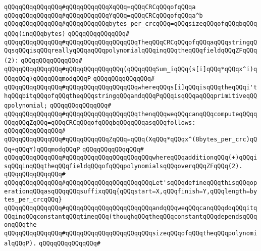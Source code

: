 \verb|qQQqqQQqqQQqqQQq#qQQqqQQqqQQqXqQQq=qQQqCRCqQQqofqQQqa|\newline
\verb|qQQqqQQqqQQqqQQq#qQQqqQQqqQQqYqQQq=qQQqCRCqQQqofqQQqa^b|\newline
\verb|qQQqqQQqqQQqqQQq#qQQqqQQqqQQqbytes_per_crcqQQq=qQQqsizeqQQqofqQQqbqQQqqQQq(inqQQqbytes)|\newline
\verb|qQQqqQQqqQQqqQQq#|\newline
\verb|qQQqqQQqqQQqqQQq#qQQqqQQqqQQqqQQqqQQqTheqQQqCRCqQQqofqQQqaqQQqstringqQQqsqQQqisqQQqreallyqQQqaqQQqpolynomialqQQqinqQQqtheqQQqfieldqQQqZFqQQq(2):|\newline
\verb|qQQqqQQqqQQqqQQq#|\newline
\verb|qQQqqQQqqQQqqQQq#qQQqqQQqqQQqqQQq(qQQqqQQqSum_iqQQq(s[i]qQQq*qQQqx^i)qQQqqQQq)qQQqqQQqmodqQQqP|\newline
\verb|qQQqqQQqqQQqqQQq#|\newline
\verb|qQQqqQQqqQQqqQQq#qQQqqQQqqQQqqQQqqQQqwhereqQQqs[i]qQQqisqQQqtheqQQqi'thqQQqbitqQQqofqQQqtheqQQqstringqQQqandqQQqPqQQqisqQQqaqQQqprimitiveqQQqpolynomial;|\newline
\verb|qQQqqQQqqQQqqQQq#|\newline
\verb|qQQqqQQqqQQqqQQq#qQQqqQQqqQQqqQQqqQQqthenqQQqweqQQqcanqQQqcomputeqQQqqQQqqQQqZqQQq=qQQqCRCqQQqofqQQqbqQQqqQQqasqQQqfollows:|\newline
\verb|qQQqqQQqqQQqqQQq#|\newline
\verb|qQQqqQQqqQQqqQQq#qQQqqQQqqQQqZqQQq=qQQq(XqQQq*qQQqx^(8bytes_per_crc)qQQq+qQQqY)qQQqmodqQQqP|\newline
\verb|qQQqqQQqqQQqqQQq#|\newline
\verb|qQQqqQQqqQQqqQQq#qQQqqQQqqQQqqQQqqQQqqQQqwhereqQQqadditionqQQq(+)qQQqisqQQqinqQQqtheqQQqfieldqQQqofqQQqpolynomialsqQQqoverqQQqZFqQQq(2).|\newline
\verb|qQQqqQQqqQQqqQQq#|\newline
\verb|qQQqqQQqqQQqqQQq#qQQqqQQqqQQqqQQqqQQqqQQqLet'sqQQqdefineqQQqthisqQQqoperationqQQqasqQQqqQQqsuffixqQQq{qQQqstart=X,qQQqfinish=Y,qQQqlength=bytes_per_crcqQQq}|\newline
\verb|qQQqqQQqqQQqqQQq#qQQqqQQqqQQqqQQqqQQqqQQqandqQQqweqQQqcanqQQqdoqQQqitqQQqinqQQqconstantqQQqtimeqQQq(thoughqQQqtheqQQqconstantqQQqdependsqQQqonqQQqthe|\newline
\verb|qQQqqQQqqQQqqQQq#qQQqqQQqqQQqqQQqqQQqqQQqsizeqQQqofqQQqtheqQQqpolynomialqQQqP).|\newline
\verb|qQQqqQQqqQQqqQQq#|\newline
\newline
